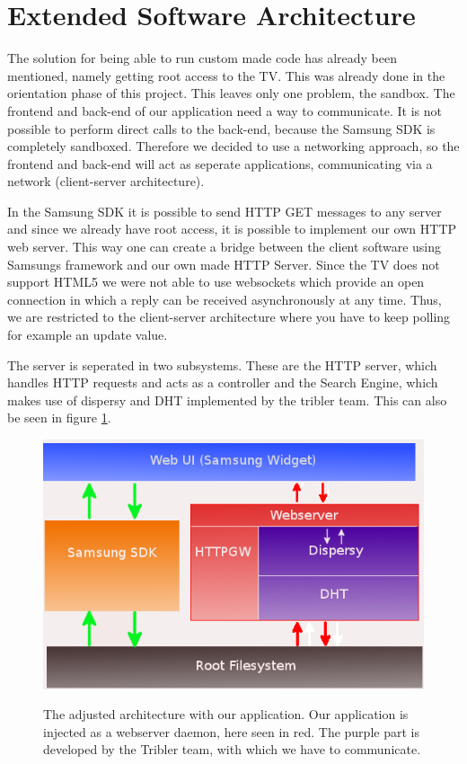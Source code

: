 \clearpage

\section{Extended Software Architecture}
The solution for being able to run custom made code has already been mentioned, namely getting root access to the TV.
This was already done in the orientation phase of this project. This leaves only one problem, the sandbox.
The frontend and back-end of our application need a way to communicate. It is not possible to perform direct calls to the back-end, because the 
Samsung SDK is completely sandboxed. Therefore we decided to use a networking approach, so the frontend and back-end will act as seperate 
applications, communicating via a network (client-server architecture).

In the Samsung SDK it is possible to send HTTP GET messages to any server and since we already have root access, it is possible to implement
our own HTTP web server. This way one can create a bridge between the client software using Samsung\textquotesingle s framework and our own made 
HTTP Server. Since the TV does not support HTML5 we were not able to use websockets which provide an open connection in which a reply can be 
received asynchronously at any time. Thus, we are restricted to the client-server architecture where you have to keep polling for example an 
update value.

The server is seperated in two subsystems. These are the HTTP server, which handles HTTP requests and acts as a controller and the Search Engine, 
which makes use of dispersy and DHT implemented by the tribler team. This can also be seen in figure \ref{fig:architecture}.

\begin{center}
\begin{figure}[h]
	\centering
	\mbox{\includegraphics[width=1\textwidth]{Images/architecture.png}}
	\label{fig:architecture}
	\caption{The adjusted architecture with our application. Our application is injected as a webserver daemon, here seen in red. 
	The purple part is developed by the Tribler team, with which we have to communicate.}
\end{figure}
\end{center}
\clearpage

